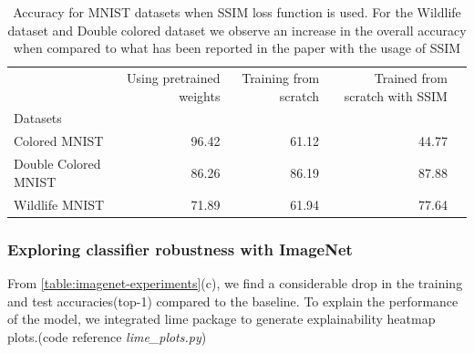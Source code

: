 \begin{table}[h]
\centering

\begin{tabular}{lrrrr}
\toprule
{} & Using pretrained weights &  Training from scratch & Trained from scratch with SSIM \cite{wang2004image}\\
Datasets  &              &              &                            \\
\midrule
Colored MNIST              &        96.42 &        61.12 &         44.77  \\
Double Colored MNIST              &        86.26  &        86.19 &         87.88  \\
Wildlife MNIST              &        71.89 &        61.94 &         77.64  \\
\bottomrule
\end{tabular}
\caption{Accuracy for MNIST datasets when SSIM  \cite{wang2004image} loss function is used. For the Wildlife dataset  and Double colored dataset we observe an increase in the overall accuracy when compared to what has been reported in the paper with the usage of SSIM \cite{wang2004image} }
\label{table:ssim-table}

\end{table}


\subsubsection{Exploring classifier robustness with ImageNet}

From \ref{table:imagenet-experiments}(c), we find a considerable drop in the training and test accuracies(top-1) compared to the baseline. To explain the performance of the model, we integrated lime\cite{lime} package to generate explainability heatmap plots.(code reference \textit{lime\_plots.py})

